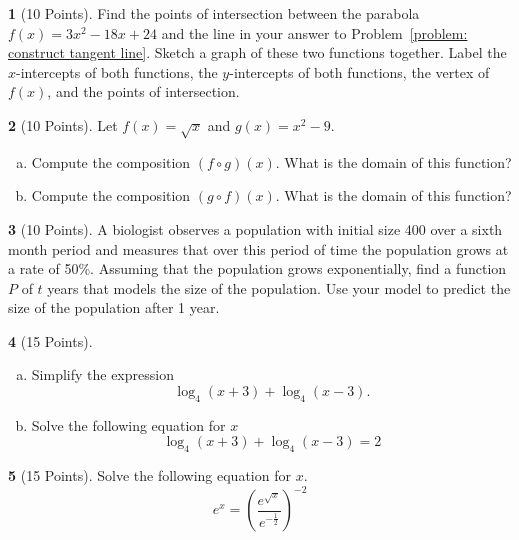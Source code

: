\documentclass[12pt]{amsart}
\theoremstyle{definition}
\newtheorem{thm}{}
\begin{document}
\begin{thm}[10 Points]\label{problem: intersection}
  Find the points of intersection between the parabola $f(x) = 3x^2 - 18x + 24$ and the line in your answer to Problem~\ref{problem: construct tangent line}.
  Sketch a graph of these two functions together.
  Label the $x$-intercepts of both functions, the $y$-intercepts of both functions, the vertex of $f(x)$, and the points of intersection.
\end{thm}

\newpage

\begin{thm}[10 Points]\label{problem: domain}
  Let $f(x) = \sqrt{x}$ and $g(x) = x^2 - 9$.
  \begin{enumerate}[(a)]
  \item
    Compute the composition $(f \circ g)(x)$.
    What is the domain of this function?
    \vspace{2in}
  \item
    Compute the composition $(g \circ f)(x)$.
    What is the domain of this function?
    \vspace{2in}
  \end{enumerate}
\end{thm}

\begin{thm}[10 Points]\label{problem: exponential function}
  A biologist observes a population with initial size 400 over a sixth month period and measures that over this period of time the population grows at a rate of 50\%.
  Assuming that the population grows exponentially, find a function $P$ of $t$ years that models the size of the population.
  Use your model to predict the size of the population after 1 year.
\end{thm}

\newpage

\begin{thm}[15 Points]\label{problem: logarithm equation}
    \begin{enumerate}[(a)]
  \item
    Simplify the expression 
    $$\log_4(x + 3) + \log_4(x - 3).$$
    \vspace{2in}
  \item
    Solve the following equation for $x$
    $$\log_4(x + 3) + \log_4(x - 3) = 2$$
    \vspace{2in}
  \end{enumerate}
\end{thm}

\begin{thm}[15 Points]\label{problem: exponential equation}
  Solve the following equation for $x$.
  $$e^{x} = \left(\frac{e^{\sqrt{x}}}{e^{-\frac{1}{2}}}\right)^{-2}$$
\end{thm}
\end{document}
